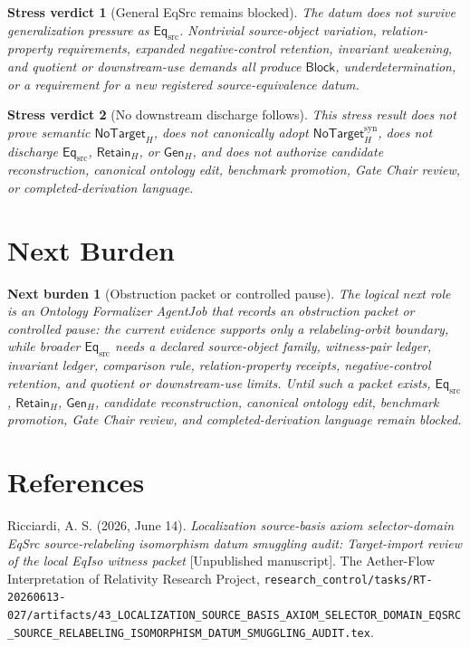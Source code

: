 \documentclass[11pt]{article}
\newcommand{\EqSrc}{\mathsf{Eq}_{\mathrm{src}}}
\newcommand{\GenH}{\mathsf{Gen}_{H}}
\newcommand{\RetainH}{\mathsf{Retain}_{H}}
\newcommand{\NoTargetH}{\mathsf{NoTarget}_{H}}
\newcommand{\NoTargetSyn}{\mathsf{NoTarget}_{H}^{\mathrm{syn}}}
\newcommand{\Block}{\mathsf{Block}}
\newtheorem{verdict}{Stress verdict}
\newtheorem{nextburden}{Next burden}
\begin{document}
\begin{verdict}[General EqSrc remains blocked]
The datum does not survive generalization pressure as \(\EqSrc\).
Nontrivial source-object variation, relation-property requirements,
expanded negative-control retention, invariant weakening, and quotient or
downstream-use demands all produce \(\Block\), underdetermination, or a
requirement for a new registered source-equivalence datum.
\end{verdict}

\begin{verdict}[No downstream discharge follows]
This stress result does not prove semantic \(\NoTargetH\), does not
canonically adopt \(\NoTargetSyn\), does not discharge \(\EqSrc\),
\(\RetainH\), or \(\GenH\), and does not authorize candidate
reconstruction, canonical ontology edit, benchmark promotion, Gate Chair
review, or completed-derivation language.
\end{verdict}

\section{Next Burden}

\begin{nextburden}[Obstruction packet or controlled pause]
The logical next role is an Ontology Formalizer AgentJob that records an
obstruction packet or controlled pause: the current evidence supports only
a relabeling-orbit boundary, while broader \(\EqSrc\) needs a declared
source-object family, witness-pair ledger, invariant ledger, comparison
rule, relation-property receipts, negative-control retention, and quotient
or downstream-use limits. Until such a packet exists, \(\EqSrc\),
\(\RetainH\), \(\GenH\), candidate reconstruction, canonical ontology
edit, benchmark promotion, Gate Chair review, and completed-derivation
language remain blocked.
\end{nextburden}

\section*{References}

Ricciardi, A. S. (2026, June 14). \emph{Localization source-basis axiom
selector-domain EqSrc source-relabeling isomorphism datum smuggling audit:
Target-import review of the local EqIso witness packet} [Unpublished
manuscript]. The Aether-Flow Interpretation of Relativity Research
Project,
\texttt{research\_control/tasks/RT-20260613-027/artifacts/43\_LOCALIZATION\_SOURCE\_BASIS\_AXIOM\_SELECTOR\_DOMAIN\_EQSRC\_SOURCE\_RELABELING\_ISOMORPHISM\_DATUM\_SMUGGLING\_AUDIT.tex}.
\end{document}
